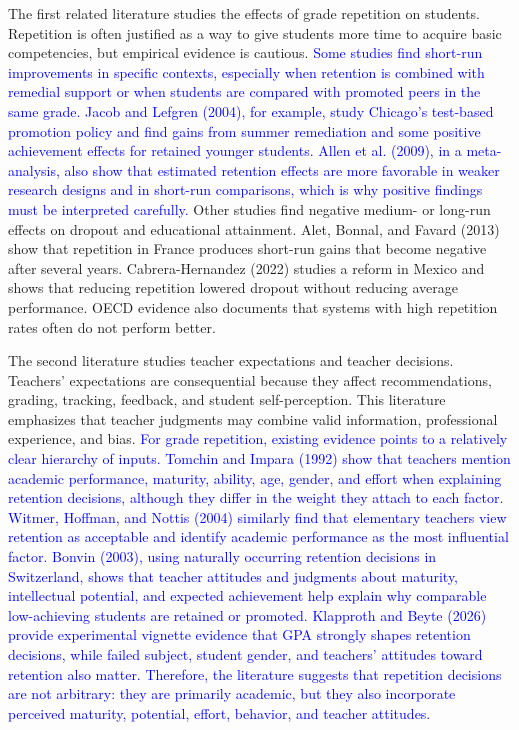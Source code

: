 \documentclass[12pt,a4paper]{article}
\begin{document}
The first related literature studies the effects of grade repetition on students. Repetition is often justified as a way to give students more time to acquire basic competencies, but empirical evidence is cautious. \textcolor{blue}{Some studies find short-run improvements in specific contexts, especially when retention is combined with remedial support or when students are compared with promoted peers in the same grade. Jacob and Lefgren (2004), for example, study Chicago's test-based promotion policy and find gains from summer remediation and some positive achievement effects for retained younger students. Allen et al. (2009), in a meta-analysis, also show that estimated retention effects are more favorable in weaker research designs and in short-run comparisons, which is why positive findings must be interpreted carefully.} Other studies find negative medium- or long-run effects on dropout and educational attainment. Alet, Bonnal, and Favard (2013) show that repetition in France produces short-run gains that become negative after several years. Cabrera-Hernandez (2022) studies a reform in Mexico and shows that reducing repetition lowered dropout without reducing average performance. OECD evidence also documents that systems with high repetition rates often do not perform better.

The second literature studies teacher expectations and teacher decisions. Teachers' expectations are consequential because they affect recommendations, grading, tracking, feedback, and student self-perception. This literature emphasizes that teacher judgments may combine valid information, professional experience, and bias. \textcolor{blue}{For grade repetition, existing evidence points to a relatively clear hierarchy of inputs. Tomchin and Impara (1992) show that teachers mention academic performance, maturity, ability, age, gender, and effort when explaining retention decisions, although they differ in the weight they attach to each factor. Witmer, Hoffman, and Nottis (2004) similarly find that elementary teachers view retention as acceptable and identify academic performance as the most influential factor. Bonvin (2003), using naturally occurring retention decisions in Switzerland, shows that teacher attitudes and judgments about maturity, intellectual potential, and expected achievement help explain why comparable low-achieving students are retained or promoted. Klapproth and Beyte (2026) provide experimental vignette evidence that GPA strongly shapes retention decisions, while failed subject, student gender, and teachers' attitudes toward retention also matter. Therefore, the literature suggests that repetition decisions are not arbitrary: they are primarily academic, but they also incorporate perceived maturity, potential, effort, behavior, and teacher attitudes.}
\end{document}
